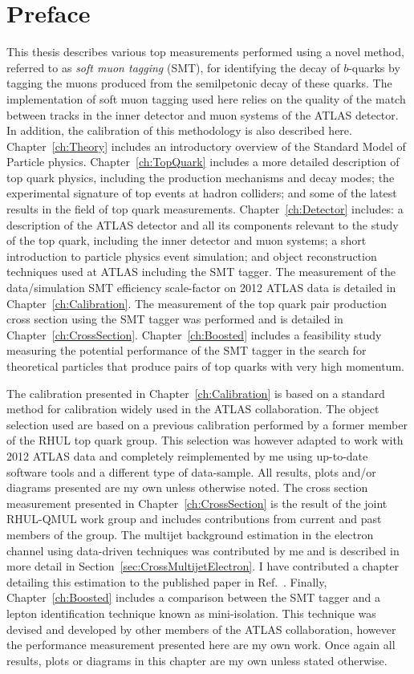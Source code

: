 \thispagestyle{empty}
\vspace{1cm}
\chapter*{Preface}
This thesis describes various top measurements performed using a novel method, referred to as \emph{soft muon tagging} (SMT), for identifying the decay of $b$-quarks by tagging the muons produced from the semilpetonic decay of these quarks. The implementation of soft muon tagging used here relies on the quality of the match between tracks in the inner detector and muon systems of the ATLAS detector. In addition, the calibration of this methodology is also described here.
Chapter~\ref{ch:Theory} includes an introductory overview of the Standard Model of Particle physics. Chapter~\ref{ch:TopQuark} includes a more detailed description of top quark physics, including the production mechanisms and decay modes; the experimental signature of top events at hadron colliders; and some of the latest results in the field of top quark measurements. Chapter~\ref{ch:Detector} includes: a description of the ATLAS detector and all its components relevant to the study of the top quark, including the inner detector and muon systems; a short introduction to particle physics event simulation; and object reconstruction techniques used at ATLAS including the SMT tagger. The measurement of the data/simulation SMT efficiency scale-factor on 2012 ATLAS data is detailed in Chapter~\ref{ch:Calibration}. The measurement of the top quark pair production cross section using the SMT tagger was performed and is detailed in Chapter~\ref{ch:CrossSection}. Chapter~\ref{ch:Boosted} includes a feasibility study measuring the potential performance of the SMT tagger in the search for theoretical particles that produce pairs of top quarks with very high momentum.

The calibration presented in Chapter~\ref{ch:Calibration} is based on a standard method for calibration widely used in the ATLAS collaboration. The object selection used are based on a previous calibration performed by a former member of the RHUL top quark group. This selection was however adapted to work with 2012 ATLAS data and completely reimplemented by me using up-to-date software tools and a different type of data-sample. All results, plots and/or diagrams presented are my own unless otherwise noted. The cross section measurement presented in Chapter~\ref{ch:CrossSection} is the result of the joint RHUL-QMUL work group and includes contributions from current and past members of the group. The multijet background estimation in the electron channel using data-driven techniques was contributed by me and is described in more detail in Section~\ref{sec:CrossMultijetElectron}. I have contributed a chapter detailing this estimation to the published paper in Ref.~\cite{Cross:SMTCrossSectionPaper}. Finally, Chapter~\ref{ch:Boosted} includes a comparison between the SMT tagger and a lepton identification technique known as mini-isolation. This technique was devised and developed by other members of the ATLAS collaboration, however the performance measurement presented here are my own work. Once again all results, plots or diagrams in this chapter are my own unless stated otherwise.

